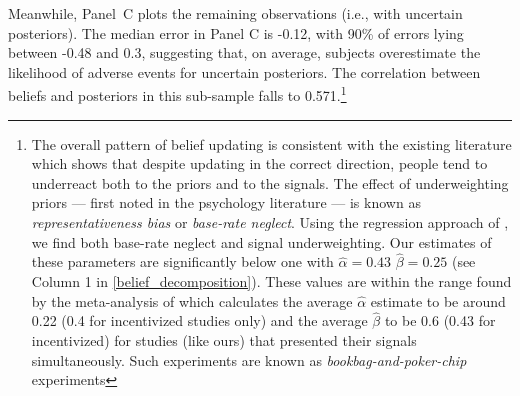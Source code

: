 \documentclass[12pt,a4paper]{article}
\begin{document}
Meanwhile, Panel~C plots the remaining observations (i.e., with uncertain posteriors). The median error in Panel C is -0.12, with 90\% of errors lying between -0.48 and 0.3, suggesting that, on average, subjects overestimate the likelihood of adverse events for uncertain posteriors. The correlation between beliefs and posteriors in this sub-sample falls to 0.571.\footnote{The overall pattern of belief updating is consistent with the existing literature which shows that despite updating in the correct direction, people tend to underreact both to the priors and to the signals. The effect of underweighting priors --- first noted in the psychology literature \citep*{phillips_conservatism_1966-1, tversky_belief_1971, kahneman_subjective_1972} --- is known as \emph{representativeness bias} or \emph{base-rate neglect}. Using the regression approach of \citet{grether_bayes_1980}, we find both base-rate neglect and signal underweighting. Our estimates of these parameters are significantly below one with $\hat \alpha=0.43$ $\hat \beta=0.25$ (see Column 1 in \ref{belief_decomposition}). These values are within the range found by the meta-analysis of \citet{benjamin_chapter_2019} which calculates the average $\hat \alpha$ estimate to be around 0.22 (0.4 for incentivized studies only) and the average $\hat \beta$ to be 0.6 (0.43 for incentivized) for studies (like ours) that presented their signals simultaneously.  Such experiments are known as \emph{bookbag-and-poker-chip} experiments} 

\end{document}
